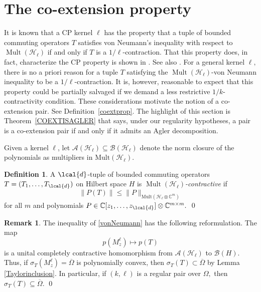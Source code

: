 \documentclass[a4paper,reqno,index]{amsart}
\newcommand{\df}[1]{{\textit{#1}}{\index{#1}}}
\numberwithin{equation}{section}
\newcommand{\CC}{\mathbb{C}}
\newcommand{\Mult}{\operatorname{Mult}}
\newcommand{\cB}{\mathcal{B}}
\newcommand{\cH}{\mathcal{H}}
\newcommand{\specT}{\sigma_T}  %
\newcommand{\ol}[1]{\overline{#1}}
\theoremstyle{definition}
\newtheorem{definition}[theorem]{Definition}
\newtheorem{remark}[theorem]{Remark}
\begin{document}
 
\section{The co-extension property}\label{Heredsection}
 \label{ss:co-ext-pairs}
It is known that  a CP kernel $\ell$  has the property that a tuple of bounded commuting operators $T$ satisfies von Neumann's inequality with respect to $\Mult(\mathcal{H}_{\ell})$ if and only if $T$ is a $1/\ell$-contraction. That this property does, in fact, characterize the CP property is shown in \cite{AgMcClocal}. See also  \cite{hyperigid}. For a general kernel $\ell,$  there is no a priori reason for a tuple $T$ satisfying the $\Mult(\mathcal{H}_{\ell})$-von Neumann inequality to be a $1/\ell$-contraction. It is, however, reasonable to expect that this property could be partially salvaged if we demand a less restrictive $1/k$-contractivity condition. These considerations motivate the notion of a co-extension pair. See Definition~\ref{coextprop}.  The highlight of this section is Theorem~\ref{COEXTISAGLER} that says, under
our regularity hypotheses, a pair is a co-extension pair if and only if it admits an Agler decomposition.


Given a  kernel $\ell$, let   $\mathcal{A}(\mathcal{H}_{\ell})\subseteq \cB(\cH_\ell)$ denote the norm closure of the polynomials as multipliers in $\text{Mult}(\mathcal{H}_{\ell}).$ 

\begin{definition}
    \label{def:mult-contraction}
A $\lcal{d}$-tuple of bounded commuting operators  $T=(T_1, \dots, T_{\lcal{d}})$ on Hilbert space $H$ is \df{$\Mult(\cH_\ell)$-contractive} if
\begin{equation} \label{vonNeumann}
  \|P(T)\| \le \|P\|_{\text{Mult}(\mathcal{H}_{\ell}\otimes \mathbb{C}^m)}  
\end{equation}
 for all $m$ and polynomials $P\in \CC[z_1, \dots, z_{\lcal{d}}]\otimes \CC^{m\times m}.$  
\qed \end{definition}

\begin{remark} \label{SpInclusion}
 The inequality of \eqref{vonNeumann} has the following reformulation. The map \[p(M^{\ell}_z)\mapsto p(T) \]
is a unital completely contractive homomorphism from $\mathcal{A}(\mathcal{H}_{\ell})$ to $\mathcal{B}(H)$. Thus, if $\specT(M^{\ell}_z)=\overline{\Omega}$ {is polynomially convex}, then $\specT(T)\subset \overline{\Omega}$ by Lemma \ref{Taylorinclusion}.  In particular, if $(k,\ell)$ is a regular pair over $\Omega,$
then $\specT(T)\subseteq \ol{\Omega}.$ 
\qed
\end{remark}
\end{document}
